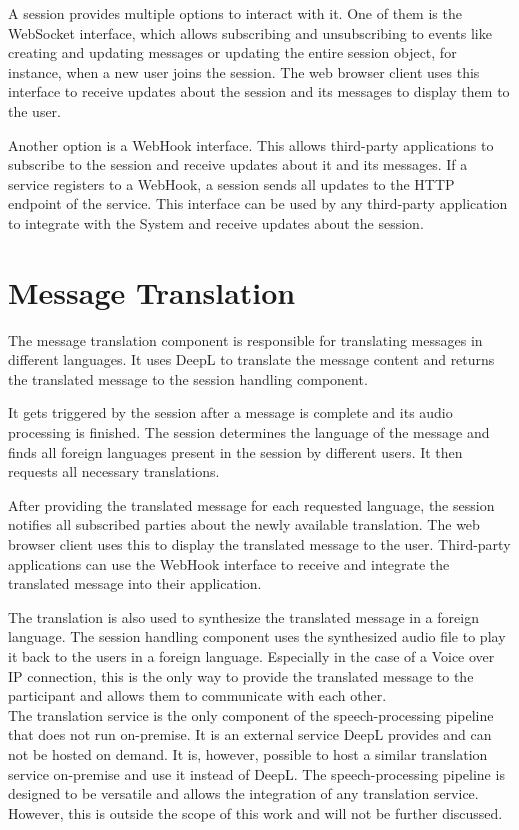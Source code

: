 A session provides multiple options to interact with it. One of them is the WebSocket interface, which allows 
subscribing and unsubscribing to events like creating and updating messages or updating the entire session object, 
for instance, when a new user joins the session. The web browser client uses this interface to receive updates about 
the session and its messages to display them to the user.

Another option is a WebHook interface. This allows third-party applications to subscribe to the session and receive 
updates about it and its messages. If a service registers to a WebHook, a session sends all updates to the HTTP 
endpoint of the service. This interface can be used by any third-party application to integrate with the System and 
receive updates about the session.


\section{Message Translation}

The message translation component is responsible for translating messages in different languages. It uses DeepL to 
translate the message content and returns the translated message to the session handling component.

It gets triggered by the session after a message is complete and its audio processing is finished. The session 
determines the language of the message and finds all foreign languages present in the session by different users. 
It then requests all necessary translations. 

After providing the translated message for each requested language, the session notifies all subscribed parties about 
the newly available translation. The web browser client uses this to display the translated message to the user. 
Third-party applications can use the WebHook interface to receive and integrate the translated message into their 
application.

The translation is also used to synthesize the translated message in a foreign language. The session handling component 
uses the synthesized audio file to play it back to the users in a foreign language. Especially in the case of a Voice 
over IP connection, this is the only way to provide the translated message to the participant and allows them to 
communicate with each other.\\

The translation service is the only component of the speech-processing pipeline that does not run on-premise. It is an 
external service DeepL provides and can not be hosted on demand. It is, however, possible to host a similar translation 
service on-premise and use it instead of DeepL. The speech-processing pipeline is designed to be versatile and allows 
the integration of any translation service. However, this is outside the scope of this work and will not be further 
discussed.
